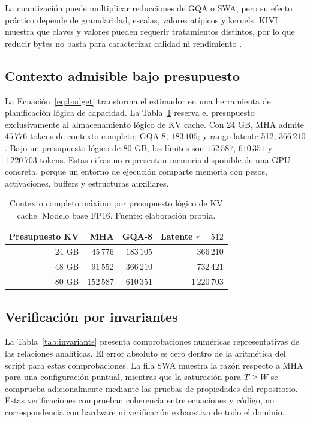 \documentclass[a4paper,twocolumn]{article}
\begin{document}
La cuantización puede multiplicar reducciones de GQA o SWA, pero su efecto práctico depende de granularidad, escalas, valores atípicos y kernels. KIVI muestra que claves y valores pueden requerir tratamientos distintos, por lo que reducir bytes no basta para caracterizar calidad ni rendimiento \cite{liu2024kivi}.

\subsection{Contexto admisible bajo presupuesto}
La Ecuación~\eqref{eq:budget} transforma el estimador en una herramienta de planificación lógica de capacidad. La Tabla~\ref{tab:budget} reserva el presupuesto exclusivamente al almacenamiento lógico de KV cache. Con 24 GB, MHA admite $45\,776$ tokens de contexto completo; GQA-8, $183\,105$; y rango latente 512, $366\,210$. Bajo un presupuesto lógico de 80 GB, los límites son $152\,587$, $610\,351$ y $1\,220\,703$ tokens. Estas cifras no representan memoria disponible de una GPU concreta, porque un entorno de ejecución comparte memoria con pesos, activaciones, buffers y estructuras auxiliares.

\begin{table}[!ht]
\centering\small
\caption{Contexto completo máximo por presupuesto lógico de KV cache. Modelo base FP16. Fuente: elaboración propia.}\label{tab:budget}
\begin{tabular}{rrrr}
\toprule
Presupuesto KV & MHA & GQA-8 & Latente $r=512$ \\
\midrule
24 GB & $45\,776$ & $183\,105$ & $366\,210$ \\
48 GB & $91\,552$ & $366\,210$ & $732\,421$ \\
80 GB & $152\,587$ & $610\,351$ & $1\,220\,703$ \\
\bottomrule
\end{tabular}
\end{table}

\subsection{Verificación por invariantes}
La Tabla~\ref{tab:invariants} presenta comprobaciones numéricas representativas de las relaciones analíticas. El error absoluto es cero dentro de la aritmética del script para estas comprobaciones. La fila SWA muestra la razón respecto a MHA para una configuración puntual, mientras que la saturación para $T\geq W$ se comprueba adicionalmente mediante las pruebas de propiedades del repositorio. Estas verificaciones comprueban coherencia entre ecuaciones y código, no correspondencia con hardware ni verificación exhaustiva de todo el dominio.
\end{document}
